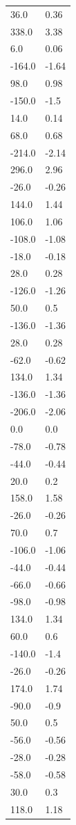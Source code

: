 \begin{longtable}{ll}
36.0 & 0.36 \\
338.0 & 3.38 \\
6.0 & 0.06 \\
-164.0 & -1.64 \\
98.0 & 0.98 \\
-150.0 & -1.5 \\
14.0 & 0.14 \\
68.0 & 0.68 \\
-214.0 & -2.14 \\
296.0 & 2.96 \\
-26.0 & -0.26 \\
144.0 & 1.44 \\
106.0 & 1.06 \\
-108.0 & -1.08 \\
-18.0 & -0.18 \\
28.0 & 0.28 \\
-126.0 & -1.26 \\
50.0 & 0.5 \\
-136.0 & -1.36 \\
28.0 & 0.28 \\
-62.0 & -0.62 \\
134.0 & 1.34 \\
-136.0 & -1.36 \\
-206.0 & -2.06 \\
0.0 & 0.0 \\
-78.0 & -0.78 \\
-44.0 & -0.44 \\
20.0 & 0.2 \\
158.0 & 1.58 \\
-26.0 & -0.26 \\
70.0 & 0.7 \\
-106.0 & -1.06 \\
-44.0 & -0.44 \\
-66.0 & -0.66 \\
-98.0 & -0.98 \\
134.0 & 1.34 \\
60.0 & 0.6 \\
-140.0 & -1.4 \\
-26.0 & -0.26 \\
174.0 & 1.74 \\
-90.0 & -0.9 \\
50.0 & 0.5 \\
-56.0 & -0.56 \\
-28.0 & -0.28 \\
-58.0 & -0.58 \\
30.0 & 0.3 \\
118.0 & 1.18 \\

\end{longtable}
